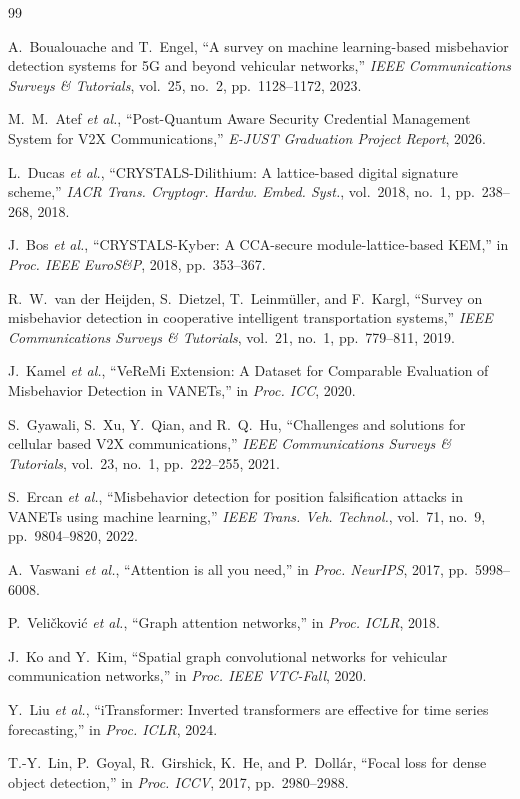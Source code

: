 \documentclass[conference]{IEEEtran}
\begin{document}
\begin{thebibliography}{99}

A.~Boualouache and T.~Engel, ``A survey on machine learning-based misbehavior
detection systems for 5G and beyond vehicular networks,''
\textit{IEEE Communications Surveys \& Tutorials}, vol.~25, no.~2,
pp.~1128--1172, 2023.

M.~M.~Atef \textit{et al.}, ``Post-Quantum Aware Security Credential
Management System for V2X Communications,''
\textit{E-JUST Graduation Project Report}, 2026.

L.~Ducas \textit{et al.}, ``CRYSTALS-Dilithium: A lattice-based digital
signature scheme,'' \textit{IACR Trans. Cryptogr. Hardw. Embed. Syst.},
vol.~2018, no.~1, pp.~238--268, 2018.

J.~Bos \textit{et al.}, ``CRYSTALS-Kyber: A CCA-secure module-lattice-based
KEM,'' in \textit{Proc. IEEE EuroS\&P}, 2018, pp.~353--367.

R.~W.~van der Heijden, S.~Dietzel, T.~Leinm{\"u}ller, and F.~Kargl,
``Survey on misbehavior detection in cooperative intelligent transportation
systems,'' \textit{IEEE Communications Surveys \& Tutorials}, vol.~21,
no.~1, pp.~779--811, 2019.

J.~Kamel \textit{et al.}, ``VeReMi Extension: A Dataset for Comparable
Evaluation of Misbehavior Detection in VANETs,''
in \textit{Proc. ICC}, 2020.

S.~Gyawali, S.~Xu, Y.~Qian, and R.~Q.~Hu,
``Challenges and solutions for cellular based V2X communications,''
\textit{IEEE Communications Surveys \& Tutorials}, vol.~23, no.~1,
pp.~222--255, 2021.

S.~Ercan \textit{et al.}, ``Misbehavior detection for position falsification
attacks in VANETs using machine learning,''
\textit{IEEE Trans. Veh. Technol.}, vol.~71, no.~9, pp.~9804--9820, 2022.

A.~Vaswani \textit{et al.}, ``Attention is all you need,''
in \textit{Proc. NeurIPS}, 2017, pp.~5998--6008.

P.~Veli{\v{c}}kovi{\'c} \textit{et al.}, ``Graph attention networks,''
in \textit{Proc. ICLR}, 2018.

J.~Ko and Y.~Kim, ``Spatial graph convolutional networks for vehicular
communication networks,'' in \textit{Proc. IEEE VTC-Fall}, 2020.

Y.~Liu \textit{et al.}, ``iTransformer: Inverted transformers are effective
for time series forecasting,'' in \textit{Proc. ICLR}, 2024.

T.-Y.~Lin, P.~Goyal, R.~Girshick, K.~He, and P.~Doll{\'a}r,
``Focal loss for dense object detection,''
in \textit{Proc. ICCV}, 2017, pp.~2980--2988.

\end{thebibliography}
\end{document}
